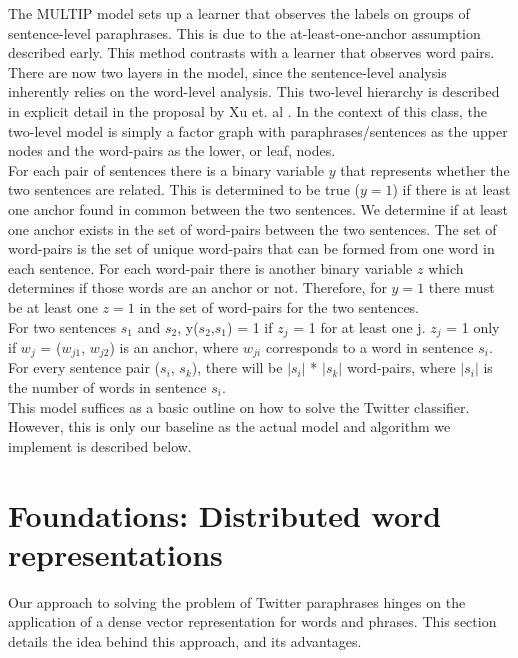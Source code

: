 \documentclass[conference]{IEEEtran}
\begin{document}
\indent The MULTIP model sets up a learner that observes the labels on groups of sentence-level paraphrases. This is due to the at-least-one-anchor assumption described early. This method contrasts with a learner that observes word pairs. There are now two layers in the model, since the sentence-level analysis inherently relies on the word-level analysis. This two-level hierarchy is described in explicit detail in the proposal by Xu et. al \cite{zane}. In the context of this class, the two-level model is simply a factor graph with paraphrases/sentences as the upper nodes and the word-pairs as the lower, or leaf, nodes.\\

\indent For each pair of sentences there is a binary variable $y$ that represents whether the two sentences are related. This is determined to be true ($y=1$) if there is at least one anchor found in common between the two sentences. We determine if at least one anchor exists in the set of word-pairs between the two sentences. The set of word-pairs is the set of unique word-pairs that can be formed from one word in each sentence. For each word-pair there is another binary variable $z$ which determines if those words are an anchor or not. Therefore, for $y=1$ there must be at least one $z=1$ in the set of word-pairs for the two sentences.  \\

For two sentences $s_{1}$ and $s_{2}$, y($s_{2}$,$s_{1}$) = 1 
if $z_{j}$ = 1 for at least one j. $z_{j}$ = 1 only if $w_{j}$ = ($w_{j1}$, $w_{j2}$) is an anchor, where $w_{ji}$ corresponds to a word in sentence $s_{i}$. For every sentence pair ($s_{i}$, $s_{k}$), there will be $|s_{i}|$ * $|s_{k}|$ word-pairs, where $|s_{i}|$ is the number of words in sentence $s_{i}$. \\

\indent This model suffices as a basic outline on how to solve the Twitter classifier. However, this is only our baseline as the actual model and algorithm we implement is described below.
 
 \section{Foundations: Distributed word representations}
 \noindent Our approach to solving the problem of Twitter paraphrases hinges on the application of a dense vector representation for words and phrases.  This section details the idea behind this approach, and its advantages.\\
\end{document}
